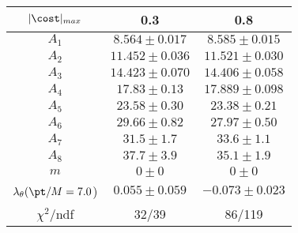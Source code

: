 \begin{tabular}{c|c|c}
$|\cost|_{max}$ & 0.3 & 0.8\\
\hline
$A_1$ & $8.564\pm0.017$ & $8.585\pm0.015$ \\
$A_2$ & $11.452\pm0.036$ & $11.521\pm0.030$ \\
$A_3$ & $14.423\pm0.070$ & $14.406\pm0.058$ \\
$A_4$ & $17.83\pm0.13$ & $17.889\pm0.098$ \\
$A_5$ & $23.58\pm0.30$ & $23.38\pm0.21$ \\
$A_6$ & $29.66\pm0.82$ & $27.97\pm0.50$ \\
$A_7$ & $31.5\pm1.7$ & $33.6\pm1.1$ \\
$A_8$ & $37.7\pm3.9$ & $35.1\pm1.9$ \\
$m$ & $0\pm0$ & $0\pm0$ \\
$\lambda_\theta(\pt/M = 7.0$) & $0.055\pm0.059$ & $-0.073\pm0.023$ \\
\hline
$\chi^2$/ndf & 32/39 & 86/119
\end{tabular}
